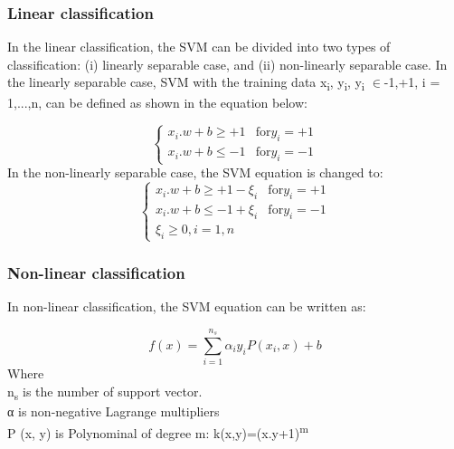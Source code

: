 \documentclass[review]{elsarticle}
\begin{document}
 		\subsubsection{Linear classification}
 		In the linear classification, the SVM can be divided into two types of classification: (i) linearly separable case, and (ii) non-linearly separable case. 
 		In the linearly separable case, SVM with the training data {x\textsubscript{i}, y\textsubscript{i}}, y\textsubscript{i} $\in${-1,+1}, i = 1,...,n, can be defined as shown in the equation below: 
		
 		\begin{equation}
 		\left\{ \begin{array}{rcl}
 		x_i . w + b \geq +1 & \mbox{for} 
 		y_i = +1 \\ x_i . w + b \leq -1 & \mbox{for}	y_i = -1
 		
 		\end{array}\right.
 		\label{eq:Linear}
 		\end{equation}
 		In the non-linearly separable case, the SVM equation is changed to: 
 		\begin{equation}
 		\left\{ \begin{array}{rcl}
 		x_i . w + b \geq +1 - \xi_i & \mbox{for} 
 		y_i = +1 \\ x_i . w + b \leq -1 +\xi_i & \mbox{for}	y_i = -1 \\ \xi_i \geq 0, i=1,n
 		
 		\end{array}\right.
 		\label{eq:nonLinear}
 		\end{equation}
 		
 		\subsubsection{Non-linear classification}
		
 		In non-linear classification, the SVM equation can be written as:
		
 		\begin{equation}
 		f(x) = \sum_{i=1}^{n_s} \alpha_i y_i P(x_i,x) +b
 		\label{eq:sum_nonLinear}
 		\end{equation}
 		Where \\
 		n\textsubscript{s} is the number of support vector. \\
 		α  is non-negative Lagrange multipliers\\
 		P (x, y) is Polynominal of degree m: k(x,y)=(x.y+1)\textsuperscript{m}
		
\end{document}
